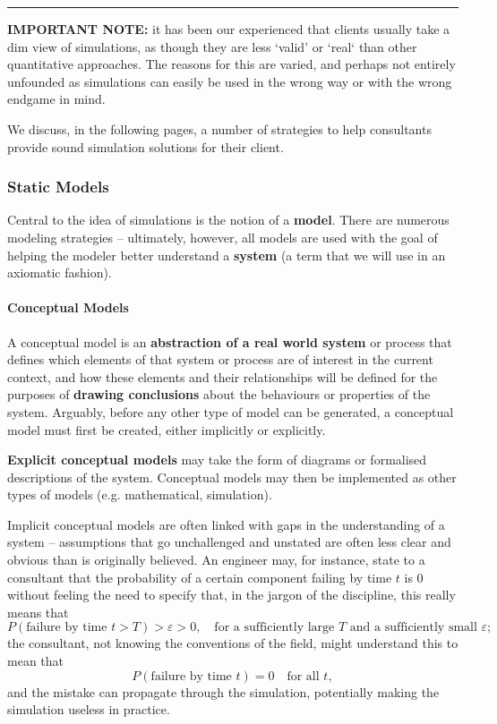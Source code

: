 \begin{center}\rule{0.5\linewidth}{.4pt}\end{center}
\textbf{IMPORTANT NOTE:} it has been our experienced that clients usually take a dim view of simulations, as though they are less `valid' or `real` than other quantitative approaches. The reasons for this are varied, and perhaps not entirely unfounded as simulations can easily be used in the wrong way or with the wrong endgame in mind. \par We discuss, in the following pages, a number of strategies to help consultants provide sound simulation solutions for their client. 
\subsubsection{Static Models}
Central to the idea of simulations is the notion of a \textbf{model}. There are numerous modeling strategies -- ultimately, however, all models are used with the goal of helping the modeler better understand a \textbf{system} (a term that we will use in an axiomatic fashion). 
\paragraph{Conceptual Models}

A conceptual model is an \textbf{abstraction of a real world system} or process that defines which elements of that system or process are of interest in the current context, and how these elements and their relationships will be defined for the purposes of \textbf{drawing conclusions} about the behaviours or properties of the system. Arguably, before any other type of model can be generated, a conceptual model must first be created, either implicitly or explicitly. 

\textbf{Explicit conceptual models} may take the form of diagrams or formalised descriptions of the system. Conceptual models may then be implemented as other types of models (e.g. mathematical, simulation). 

{Implicit conceptual models} are often linked with gaps in the understanding of a system -- assumptions that go unchallenged and unstated are often less clear and obvious than is originally believed. An engineer may, for instance, state to a consultant that the probability of a certain component failing by time $t$ is 0 without feeling the need to specify that, in the jargon of the discipline, this really means that $$P(\textrm{failure by time }t>T)>\varepsilon>0,\quad \mbox{for a sufficiently large } T \mbox{ and a sufficiently small }\varepsilon;$$ the consultant, not knowing the conventions of the field, might understand this to mean that  $$P(\textrm{failure by time }t)=0\quad \mbox{for all } t,$$ and the mistake can propagate through the simulation, potentially making the simulation useless in practice.   

